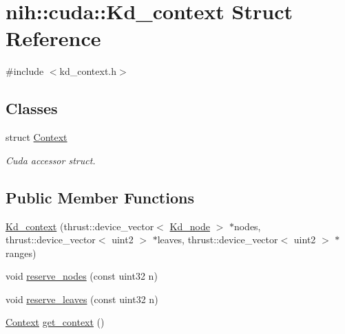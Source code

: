 \hypertarget{structnih_1_1cuda_1_1_kd__context}{
\section{nih\-:\-:cuda\-:\-:\-Kd\-\_\-context \-Struct \-Reference}
\label{structnih_1_1cuda_1_1_kd__context}
}


{\ttfamily \#include $<$kd\-\_\-context.\-h$>$}

\subsection*{\-Classes}
\begin{DoxyCompactItemize}
\item 
struct \hyperlink{structnih_1_1cuda_1_1_kd__context_1_1_context}{\-Context}
\begin{DoxyCompactList}\small\item\em \-Cuda accessor struct. \end{DoxyCompactList}\end{DoxyCompactItemize}
\subsection*{\-Public \-Member \-Functions}
\begin{DoxyCompactItemize}
\item 
\hyperlink{structnih_1_1cuda_1_1_kd__context_aad6e96c8b13921717365ad860e6620af}{\-Kd\-\_\-context} (thrust\-::device\-\_\-vector$<$ \hyperlink{structnih_1_1_kd__node}{\-Kd\-\_\-node} $>$ $\ast$nodes, thrust\-::device\-\_\-vector$<$ uint2 $>$ $\ast$leaves, thrust\-::device\-\_\-vector$<$ uint2 $>$ $\ast$ranges)
\item 
void \hyperlink{structnih_1_1cuda_1_1_kd__context_a8773a94cb2efb9297e2a2b7f1e772d77}{reserve\-\_\-nodes} (const uint32 n)
\item 
void \hyperlink{structnih_1_1cuda_1_1_kd__context_a27ff1671ea464db8f1250f42229b5d1c}{reserve\-\_\-leaves} (const uint32 n)
\item 
\hyperlink{structnih_1_1cuda_1_1_kd__context_1_1_context}{\-Context} \hyperlink{structnih_1_1cuda_1_1_kd__context_a0675465ac211dc183a1f3d3fe4533d26}{get\-\_\-context} ()
\end{DoxyCompactItemize}

